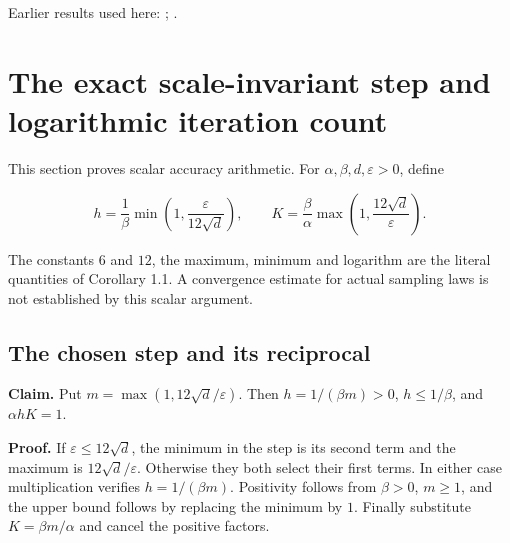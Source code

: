 \documentclass[11pt,a4paper]{report}
\begin{document}
Earlier results used here: \cite[Section~3.17.3]{LangevinLean2026ULASC}; \cite[Section~3.17.4]{LangevinLean2026ULASC}.
\section{\texorpdfstring{The exact scale-invariant step and logarithmic iteration count}{The exact scale-invariant step and logarithmic iteration count}}
\label{proof-module-WassersteinMixing-Complexity-lean}


This section proves scalar accuracy arithmetic. For \(\alpha,\beta,d,\varepsilon>0\), define

\[h=\frac1\beta\min\left(1,\frac{\varepsilon}{12\sqrt d}\right),
\qquad K=\frac\beta\alpha\max\left(1,\frac{12\sqrt d}{\varepsilon}\right).\]


The constants \(6\) and \(12\), the maximum, minimum and logarithm are the literal quantities of Corollary 1.1. A convergence estimate for actual sampling laws is not established by this scalar argument.

\subsection{\texorpdfstring{The chosen step and its reciprocal}{The chosen step and its reciprocal}}
\label{report-step-WassersteinMixing-Complexity-lean-1}


\textbf{Claim.} Put \(m=\max(1,12\sqrt d/\varepsilon)\). Then \(h=1/(\beta m)>0\), \(h\le1/\beta\), and \(\alpha hK=1\).




\textbf{Proof.} If \(\varepsilon\le12\sqrt d\), the minimum in the step is its second term and the maximum is \(12\sqrt d/\varepsilon\). Otherwise they both select their first terms. In either case multiplication verifies \(h=1/(\beta m)\). Positivity follows from \(\beta>0\), \(m\ge1\), and the upper bound follows by replacing the minimum by \(1\). Finally substitute \(K=\beta m/\alpha\) and cancel the positive factors.
\end{document}
